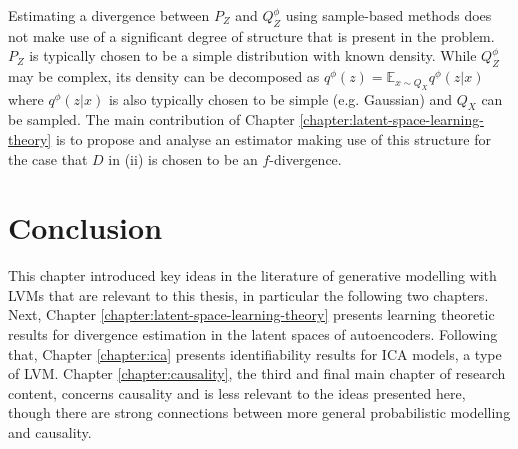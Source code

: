 Estimating a divergence between $P_Z$ and $Q_Z^\phi$ using sample-based methods does not make use of a significant degree of structure that is present in the problem. $P_Z$ is typically chosen to be a simple distribution with known density. While $Q_Z^\phi$ may be complex, its density can be decomposed as $q^\phi(z) = \mathbb{E}_{x\sim Q_X} q^\phi(z|x)$ where $q^\phi(z|x)$ is also typically chosen to be simple (e.g. Gaussian) and $Q_X$ can be sampled.
The main contribution of Chapter \ref{chapter:latent-space-learning-theory} is to propose and analyse an estimator making use of this structure for the case that $D$ in (ii) is chosen to be an $f$-divergence. 


\section{Conclusion}

This chapter introduced key ideas in the literature of generative modelling with LVMs that are relevant to this thesis, in particular the following two chapters.
Next, Chapter \ref{chapter:latent-space-learning-theory} presents learning theoretic results for divergence estimation in the latent spaces of autoencoders.
Following that, Chapter \ref{chapter:ica} presents identifiability results for ICA models, a type of LVM. 
Chapter \ref{chapter:causality}, the third and final main chapter of research content, concerns causality and is less relevant to the ideas presented here, though there are strong connections between more general probabilistic modelling and causality. 
